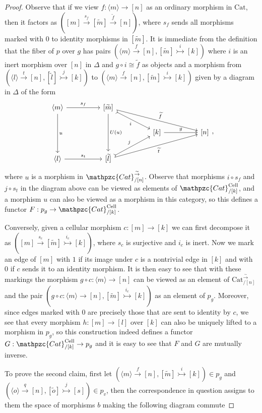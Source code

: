 \documentclass[a4paper, reqno]{amsart}
\theoremstyle{definition}
\newcommand\cat{\mathrm{Cat}}
\newcommand\ccat{\mathpzc{Cat}}
\newcommand\cell{\mathrm{Cell}}
\newcommand\bm{\langle m\rangle}
\newcommand\bl{\langle l\rangle}
\newcommand\wrr{{\overset{\sim}{\rightarrow}}}
\begin{document}
\begin{proof}
Observe that if we view $f:\bm\rightarrow[n]$ as an ordinary morphism in $\cat$, then it factors as $([m]\xrightarrow{s_f}[\widetilde{m}]\xrightarrow{\widetilde{f}}[n])$, where $s_f$ sends all morphisms marked with $0$ to identity morphisms in $[\widetilde{m}]$. It is immediate from the definition that the fiber of $p$ over $g$ has pairs $(\bm\xrightarrow{f}[n],[\widetilde{m}]\overset{i}{\rightarrowtail}[k])$ where $i$ is an inert morphism over $[n]$ in $\Delta$ and $g\circ i\cong \widetilde{f}$ as objects and a morphism from $(\bl\xrightarrow{t}[n],[\widetilde{l}]\overset{j}{\rightarrowtail}[k])$ to $(\bm\xrightarrow{f}[n],[\widetilde{m}]\overset{i}{\rightarrowtail}[k])$ given by a diagram in $\Delta$ of the form
\[
\begin{tikzcd}[column sep=huge]
\bm\arrow[r,"s_f"]\arrow[dd, "u"]&{[\widetilde{m}]}\arrow[dd, "U(u)"]\arrow[rd, tail, "i" swap]\arrow[rrd,"\widetilde{f}"]\\
{}&{}&{[k]}\arrow[r, "g"]&{[n]}\\
\bl\arrow[r, "s_t"]&{[\widetilde{l}]}\arrow[ur, tail, "j"]\arrow[urr, "\widetilde{t}" swap]
\end{tikzcd},
\]
where $u$ is a morphism in $\ccat^\wrr_{/[n]}$. Observe that morphisms $i\circ s_f$ and $j\circ s_t$ in the diagram above can be viewed as elements of $\ccat^\cell_{/[k]}$, and a morphism $u$ can also be viewed as a morphism in this category, so this defines a functor $F:p_g\rightarrow\ccat^\cell_{/[k]}$.\par
Conversely, given a cellular morphism $c:[m]\rightarrow[k]$ we can first decompose it as $([m]\xrightarrow{s_c}[\widetilde{m}]\overset{i_c}{\rightarrowtail}[k])$, where $s_c$ is surjective and $i_c$ is inert. Now we mark an edge of $[m]$ with $1$ if its image under $c$ is a nontrivial edge in $[k]$ and with $0$ if $c$ sends it to an identity morphism. It is then easy to see that with these markings the morphism $g\circ c:\bm\rightarrow[n]$ can be viewed as an element of $\cat^\wrr_{/[n]}$ and the pair $(g\circ c:\bm\rightarrow [n], [\widetilde{m}]\overset{i_c}{\rightarrowtail}[k])$ as an element of $p_g$. Moreover, since edges marked with $0$ are precisely those that are sent to identity by $c$, we see that every morphism $h:[m]\rightarrow[l]$ over $[k]$ can also be uniquely lifted to a morphism in $p_g$, so this construction indeed defines a functor $G:\ccat^\cell_{/[k]}\rightarrow p_g$ and it is easy to see that $F$ and $G$ are mutually inverse.\par
To prove the second claim, first let $(\bm\xrightarrow{f}[n],[\widetilde{m}]\overset{i}{\rightarrowtail}[k])\in p_g$ and $(\langle o\rangle\xrightarrow{q}[n],[\widetilde{o}]\overset{j}{\rightarrowtail}[s])\in p_v$, then the correspondence in question assigns to them the space of morphisms $b$ making the following diagram commute

\end{proof}
\end{document}
